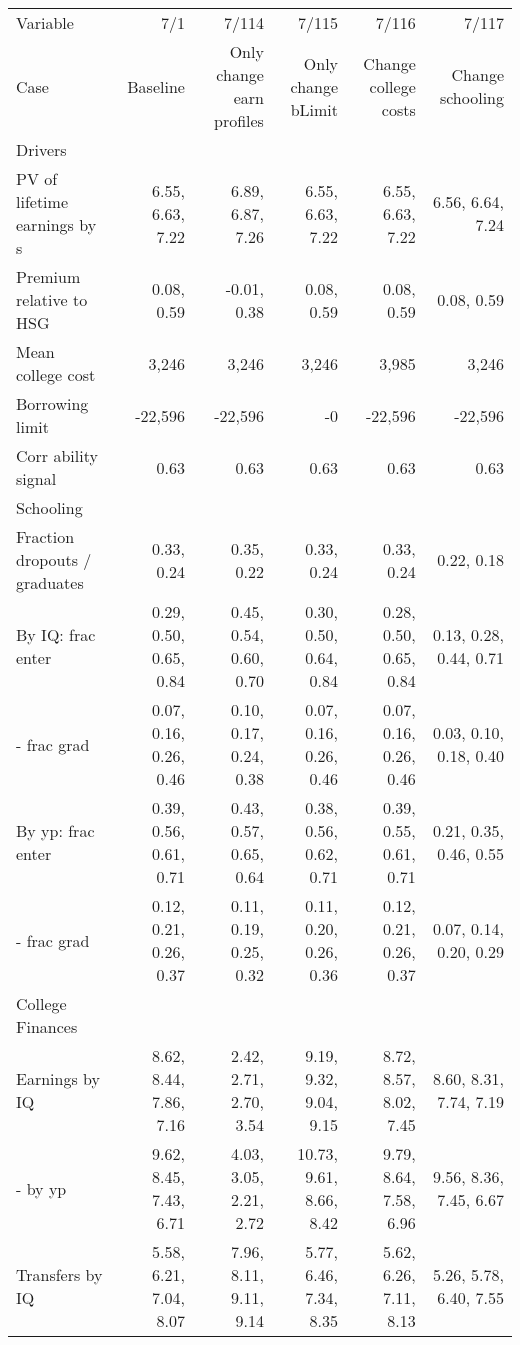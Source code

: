 \begin{tabular}{lrrrrr}
\hline
Variable & 7/1  & 7/114  & 7/115  & 7/116  & 7/117  \\ 
Case & Baseline  & Only change earn profiles  & Only change bLimit  & Change college costs  & Change schooling  \\ 
Drivers &   &   &   &   &   \\ 
PV of lifetime earnings by s & 6.55, 6.63, 7.22  & 6.89, 6.87, 7.26  & 6.55, 6.63, 7.22  & 6.55, 6.63, 7.22  & 6.56, 6.64, 7.24  \\ 
Premium relative to HSG & 0.08, 0.59  & -0.01, 0.38  & 0.08, 0.59  & 0.08, 0.59  & 0.08, 0.59  \\ 
Mean college cost & 3,246  & 3,246  & 3,246  & 3,985  & 3,246  \\ 
Borrowing limit & -22,596  & -22,596  & -0  & -22,596  & -22,596  \\ 
Corr ability signal & 0.63  & 0.63  & 0.63  & 0.63  & 0.63  \\ 
\hline
Schooling &   &   &   &   &   \\ 
Fraction dropouts / graduates & 0.33, 0.24  & 0.35, 0.22  & 0.33, 0.24  & 0.33, 0.24  & 0.22, 0.18  \\ 
By IQ: frac enter & 0.29, 0.50, 0.65, 0.84  & 0.45, 0.54, 0.60, 0.70  & 0.30, 0.50, 0.64, 0.84  & 0.28, 0.50, 0.65, 0.84  & 0.13, 0.28, 0.44, 0.71  \\ 
- frac grad & 0.07, 0.16, 0.26, 0.46  & 0.10, 0.17, 0.24, 0.38  & 0.07, 0.16, 0.26, 0.46  & 0.07, 0.16, 0.26, 0.46  & 0.03, 0.10, 0.18, 0.40  \\ 
By yp: frac enter & 0.39, 0.56, 0.61, 0.71  & 0.43, 0.57, 0.65, 0.64  & 0.38, 0.56, 0.62, 0.71  & 0.39, 0.55, 0.61, 0.71  & 0.21, 0.35, 0.46, 0.55  \\ 
- frac grad & 0.12, 0.21, 0.26, 0.37  & 0.11, 0.19, 0.25, 0.32  & 0.11, 0.20, 0.26, 0.36  & 0.12, 0.21, 0.26, 0.37  & 0.07, 0.14, 0.20, 0.29  \\ 
\hline
College Finances &   &   &   &   &   \\ 
Earnings by IQ & 8.62, 8.44, 7.86, 7.16  & 2.42, 2.71, 2.70, 3.54  & 9.19, 9.32, 9.04, 9.15  & 8.72, 8.57, 8.02, 7.45  & 8.60, 8.31, 7.74, 7.19  \\ 
- by yp & 9.62, 8.45, 7.43, 6.71  & 4.03, 3.05, 2.21, 2.72  & 10.73, 9.61, 8.66, 8.42  & 9.79, 8.64, 7.58, 6.96  & 9.56, 8.36, 7.45, 6.67  \\ 
Transfers by IQ & 5.58, 6.21, 7.04, 8.07  & 7.96, 8.11, 9.11, 9.14  & 5.77, 6.46, 7.34, 8.35  & 5.62, 6.26, 7.11, 8.13  & 5.26, 5.78, 6.40, 7.55  \\ 

\end{tabular}
